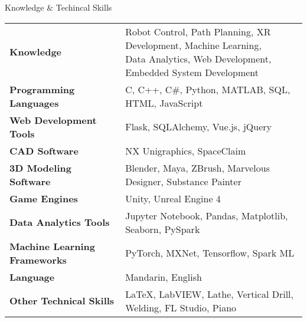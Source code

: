 \documentclass{resume} %
\begin{document}
\begin{rSection}{Knowledge \& Techincal Skills}

\begin{tabular}{ @{} >{\bfseries}l @{\hspace{6ex}} l }
Knowledge & \pbox{20cm}{Robot Control, Path Planning, XR Development, Machine Learning, 
                        \\Data Analytics, Web Development, Embedded System Development
                        } \smallskip\\

Programming Languages & C, C++, C\#, Python, MATLAB, SQL, HTML, JavaScript\\
Web Development Tools & Flask, SQLAlchemy, Vue.js, jQuery \\
CAD Software & NX Unigraphics, SpaceClaim  \\
3D Modeling Software & Blender, Maya, ZBrush, Marvelous Designer, Substance Painter\\
Game Engines & Unity, Unreal Engine 4 \\
Data Analytics Tools & Jupyter Notebook, Pandas, Matplotlib, Seaborn, PySpark\\
Machine Learning Frameworks & PyTorch, MXNet, Tensorflow, Spark ML\\
Language & Mandarin, English \\
Other Technical Skills & LaTeX, LabVIEW, Lathe, Vertical Drill, Welding, FL Studio, Piano
\end{tabular}

\end{rSection}





\end{document}
